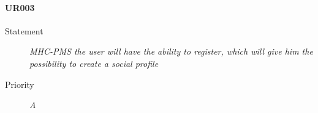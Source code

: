 \paragraph{UR003}
\begin{description}
  \item [Statement] 
    \textit{\gls{MHC-PMS} the user will have the ability to register, which will give him the possibility to create a social profile}
  \item [Priority] \textit{A}
\end{description}


